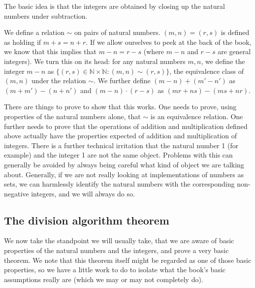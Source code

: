 \documentclass[12pt]{article}
\begin{document}
The basic idea is that the integers are obtained by closing up the natural numbers under subtraction. 

We define a relation $\sim$ on pairs of natural numbers.  $(m,n) = (r,s)$ is defined as holding if $m+s = n+r$.  If we allow ourselves to peek at the back of the book, we know that this implies that $m-n = r-s$ (where $m-n$ and $r-s$ are general integers).  We turn this on its head: for any natural numbers $m,n$, we define the integer $m-n$ as $\{(r,s) \in {\mathbb N} \times {\mathbb N}:(m,n) \sim (r,s)\}$, the equivalence class of $(m,n)$ under the relation $\sim$.  We further define
$(m-n) + (m'-n')$ as $(m+m')-(n+n')$ and $(m-n) \cdot (r-s)$ as $(mr +ns)-(ms + nr)$.

There are things to prove to show that this works.  One needs to prove, using properties of the natural numbers alone,
that $\sim$ is an equivalence relation.  One further needs to prove that the operations of addition and multiplication defined
above actually have the properties expected of addition and multiplication of integers.  There is a further technical irritation that the natural number 1 (for example) and the integer 1 are not the same object.  Problems with this can generally be avoided by always being careful what kind of object we are talking about.  Generally, if we are not really looking at implementations of numbers
as sets, we can harmlessly identify the natural numbers with the corresponding non-negative integers, and we will always do so.

\subsection{The division algorithm theorem}

We now take the standpoint we will usually take, that we are aware of basic properties of the natural numbers and the integers,
and prove a very basic theorem.  We note that this theorem itself might be regarded as one of those basic properties, so we have a little work to do to isolate what the book's basic assumptions really are (which we may or may not completely do).
\end{document}
